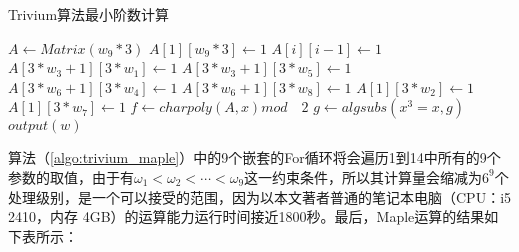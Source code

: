 \begin{algorithm}[H]
  \caption{Trivium算法最小阶数计算}
  \label{algo:trivium_maple}
  \begin{algorithmic}
    
                      \STATE $A \leftarrow Matrix(w_{9}*3)$
                      \STATE $A[1][w_{9}*3] \leftarrow 1$
                        \STATE $A[i][i - 1] \leftarrow 1$
                      \ENDFOR 
                      \STATE $A[3*w_{3}+1][3*w_{1}] \leftarrow 1$
                      \STATE $A[3*w_{3}+1][3*w_{5}] \leftarrow 1$
                      \STATE $A[3*w_{6}+1][3*w_{4}] \leftarrow 1$
                      \STATE $A[3*w_{6}+1][3*w_{8}] \leftarrow 1$
                      \STATE $A[1][3*w_{2}] \leftarrow 1$
                      \STATE $A[1][3*w_{7}] \leftarrow 1$
                      \STATE $f \leftarrow charpoly(A, x) mod \quad 2$
                        \STATE $g \leftarrow algsubs(x^{3}=x, g)$
                          \STATE $output(w)$
                        \ENDIF
                      \ENDIF
                    \ENDFOR
                  \ENDFOR
                \ENDFOR
              \ENDFOR
            \ENDFOR
          \ENDFOR
        \ENDFOR
      \ENDFOR
    \ENDFOR
    
  \end{algorithmic}
\end{algorithm}

算法（\ref{algo:trivium_maple}）中的9个嵌套的For循环将会遍历1到14中所有的9个参数的取值，由于有$\omega_{1}<\omega_{2}<\cdots<\omega_{9}$这一约束条件，所以其计算量会缩减为$6^9$个处理级别，是一个可以接受的范围，因为以本文著者普通的笔记本电脑（CPU：i5 2410，内存 4GB）的运算能力运行时间接近1800秒。最后，Maple运算的结果如下表所示：

